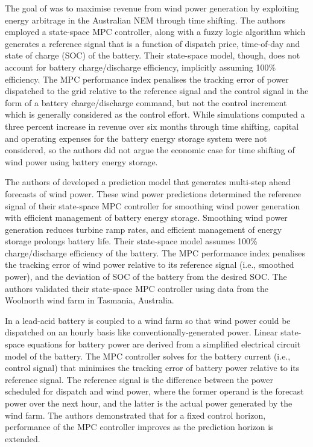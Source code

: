 \documentclass[a4paper, 10pt, twocolumn, preprint, 3p]{elsarticle}
\begin{document}
The goal of \cite{KKSA13} was to maximise revenue from wind power generation by exploiting energy arbitrage in the Australian NEM through time shifting.  The authors employed a state-space MPC controller, along with a fuzzy logic algorithm which generates a reference signal that is a function of dispatch price, time-of-day and state of charge (SOC) of the battery.  Their state-space model, though, does not account for battery charge/discharge efficiency, implicitly assuming 100\% efficiency.  The MPC performance index penalises the tracking error of power dispatched to the grid relative to the reference signal and the control signal in the form of a battery charge/discharge command, but not the control increment which is generally considered as the control effort.  While simulations computed a three percent increase in revenue over six months through time shifting, capital and operating expenses for the battery energy storage system were not considered, so the authors did not argue the economic case for time shifting of wind power using battery energy storage.

The authors of \cite{KS10} developed a prediction model that generates multi-step ahead forecasts of wind power.  These wind power predictions determined the reference signal of their state-space MPC controller for smoothing wind power generation with efficient management of battery energy storage.  Smoothing wind power generation reduces turbine ramp rates, and efficient management of energy storage prolongs battery life.  Their state-space model assumes 100\% charge/discharge efficiency of the battery.  The MPC performance index penalises the tracking error of wind power relative to its reference signal (i.e., smoothed power), and the deviation of SOC of the battery from the desired SOC.  The authors validated their state-space MPC controller using data from the Woolnorth wind farm in Tasmania, Australia.

In \cite{TBBH10} a lead-acid battery is coupled to a wind farm so that wind power could be dispatched on an hourly basis like conventionally-generated power.  Linear state-space equations for battery power are derived from a simplified electrical circuit model of the battery.  The MPC controller solves for the battery current (i.e., control signal) that minimises the tracking error of battery power relative to its reference signal.  The reference signal is the difference between the power scheduled for dispatch and wind power, where the former operand is the forecast power over the next hour, and the latter is the actual power generated by the wind farm.  The authors demonstrated that for a fixed control horizon, performance of the MPC controller improves as the prediction horizon is extended.
\end{document}
